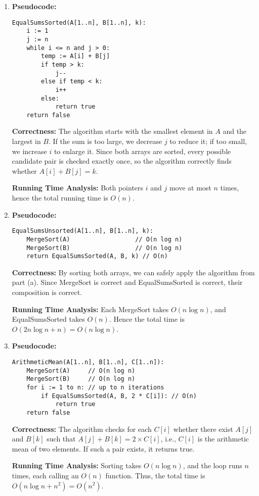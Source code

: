 \documentclass{article}
\begin{document}
\begin{enumerate}[label=\alph*)]

\item \textbf{Pseudocode:}
\begin{verbatim}
EqualSumsSorted(A[1..n], B[1..n], k):
    i := 1 
    j := n
    while i <= n and j > 0: 
        temp := A[i] + B[j] 
        if temp > k:
            j--
        else if temp < k:
            i++
        else:
            return true
    return false
\end{verbatim}

\textbf{Correctness:}  
The algorithm starts with the smallest element in \(A\) and the largest in \(B\).  
If the sum is too large, we decrease \(j\) to reduce it; if too small, we increase \(i\) to enlarge it.  
Since both arrays are sorted, every possible candidate pair is checked exactly once, so the algorithm correctly finds whether \(A[i] + B[j] = k\).

\textbf{Running Time Analysis:}  
Both pointers \(i\) and \(j\) move at most \(n\) times, hence the total running time is \(O(n)\).

\item \textbf{Pseudocode:}
\begin{verbatim}
EqualSumsUnsorted(A[1..n], B[1..n], k):
    MergeSort(A)                  // O(n log n)
    MergeSort(B)                  // O(n log n)
    return EqualSumsSorted(A, B, k) // O(n)
\end{verbatim}

\textbf{Correctness:}  
By sorting both arrays, we can safely apply the algorithm from part (a).  
Since MergeSort is correct and EqualSumsSorted is correct, their composition is correct.

\textbf{Running Time Analysis:}  
Each MergeSort takes \(O(n \log n)\), and EqualSumsSorted takes \(O(n)\).  
Hence the total time is \(O(2n \log n + n) = O(n \log n)\).

\item \textbf{Pseudocode:}
\begin{verbatim}
ArithmeticMean(A[1..n], B[1..n], C[1..n]):
    MergeSort(A)     // O(n log n)
    MergeSort(B)     // O(n log n)
    for i := 1 to n: // up to n iterations
        if EqualSumsSorted(A, B, 2 * C[i]): // O(n)
            return true
    return false
\end{verbatim}

\textbf{Correctness:}  
The algorithm checks for each \(C[i]\) whether there exist \(A[j]\) and \(B[k]\) such that  
\(A[j] + B[k] = 2 \times C[i]\), i.e., \(C[i]\) is the arithmetic mean of two elements.  
If such a pair exists, it returns true.

\textbf{Running Time Analysis:}  
Sorting takes \(O(n \log n)\), and the loop runs \(n\) times, each calling an \(O(n)\) function.  
Thus, the total time is \(O(n \log n + n^2) = O(n^2)\).

\end{enumerate}
\end{document}
